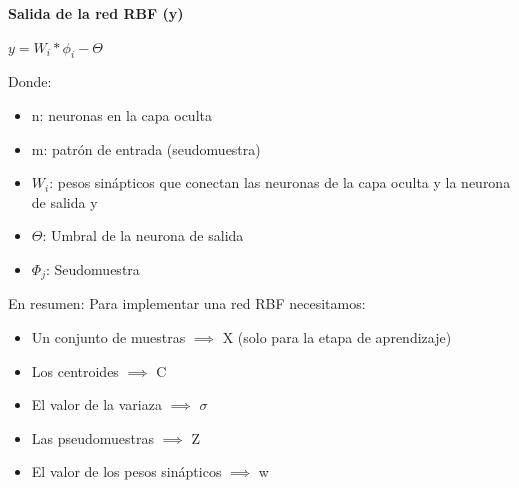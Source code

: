 \documentclass[
	11pt, %
]{beamer}
\begin{document}
\begin{frame}

  \textbf{Salida de la red RBF (y)}
  \bigskip %
  \begin{center}
    $y = W_{i} * \phi_{i} - \Theta $
  \end{center}
  \bigskip %
  Donde:
  \begin{itemize}
  \item n: neuronas en la capa oculta
  \item m: patrón de entrada (seudomuestra)
  \item $W_{i}$: pesos sinápticos que conectan las neuronas de la capa oculta y la neurona de salida y
  \item $\Theta$: Umbral de la neurona de salida
  \item $\Phi_{j}$: Seudomuestra
  \end{itemize}
  
\end{frame}


\begin{frame}
  En resumen:
  Para implementar una red RBF necesitamos:
  \bigskip %
  \begin{itemize}
  \item Un conjunto de muestras $\implies$ X (solo para la etapa de aprendizaje)
  \item Los centroides $\implies$ C
  \item El valor de la variaza $\implies$ $\sigma$
  \item Las pseudomuestras $\implies$ Z
  \item El valor de los pesos sinápticos $\implies$ w
  \end{itemize}
\end{frame}
\end{document}
